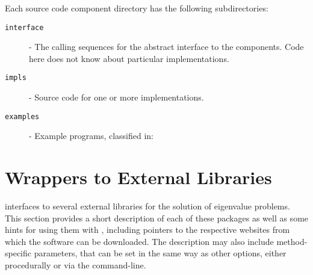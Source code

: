 
Each \slepc source code component directory has the following subdirectories:
\begin{description}
\item[\texttt{interface}] - The calling sequences for the abstract interface to the components. Code here does not know about particular implementations.
\item[\texttt{impls}] - Source code for one or more implementations.
\item[\texttt{examples}] - Example programs, classified in:
\end{description}





\section{Wrappers to External Libraries}
\label{sec:wrap}

	\slepc interfaces to several external libraries for the solution of eigenvalue problems. This section provides a short description of each of these packages as well as some hints for using them with \slepc, including pointers to the respective websites from which the software can be downloaded. The description may also include method-specific parameters, that can be set in the same way as other \slepc options, either procedurally or via the command-line.

